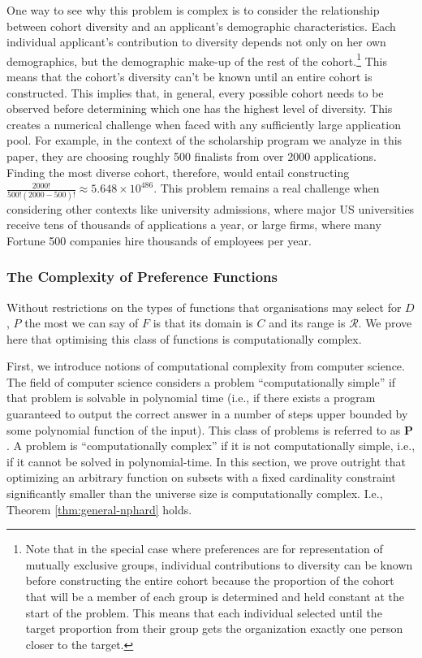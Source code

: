 One way to see why this problem is complex is to consider the relationship between cohort diversity and an applicant's demographic characteristics. Each individual applicant's contribution to diversity depends not only on her own demographics, but the demographic make-up of the rest of the cohort.\footnote{Note that in the special case where preferences are for representation of mutually exclusive groups, individual contributions to diversity can be known before constructing the entire cohort because the proportion of the cohort that will be a member of each group is determined and held constant at the start of the problem. This means that each individual selected until the target proportion from their group gets the organization exactly one person closer to the target.} This means that the cohort's diversity can't be known until an entire cohort is constructed. This implies that, in general, every possible cohort needs to be observed before determining which one has the highest level of diversity. This creates a numerical challenge when faced with any sufficiently large application pool. For example, in the context of the scholarship program we analyze in this paper, they are choosing roughly 500 finalists from over 2000 applications. Finding the most diverse cohort, therefore, would entail constructing $\frac{2000!}{500!(2000-500)!} \approx 5.648\times10^{486}$. This problem remains a real challenge when considering other contexts like university admissions, where major US universities receive tens of thousands of applications a year, or large firms, where many Fortune 500 companies hire thousands of employees per year.  

\subsubsection{The Complexity of Preference Functions}\label{subsubsec:proof_nphard}

Without restrictions on the types of functions that organisations may select for $D$, $P$ the most we can say of $F$ is that its domain is $C$ and its range is $\mathcal{R}$. We prove here that optimising this class of functions is computationally complex.

First, we introduce notions of computational complexity from computer science. The field of computer science considers a problem ``computationally simple'' if that problem is solvable in polynomial time (i.e., if there exists a program guaranteed to output the correct answer in a number of steps upper bounded by some polynomial function of the input). This class of problems is referred to as $\mathbf{P}$. A problem is ``computationally complex'' if it is not computationally simple, i.e., if it cannot be solved in polynomial-time. In this section, we prove outright that optimizing an arbitrary function on subsets with a fixed cardinality constraint significantly smaller than the universe size is computationally complex. I.e., Theorem \ref{thm:general-nphard} holds.


